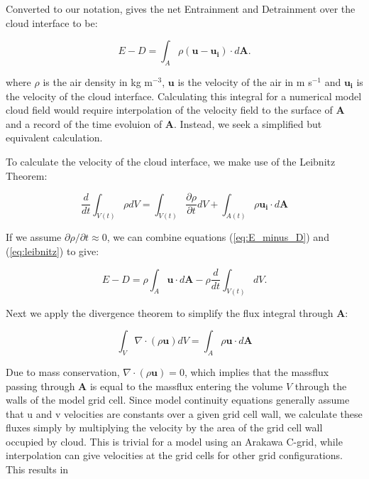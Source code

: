 \documentclass[12pt]{article}
\begin{document}
Converted to our notation, \cite{Siebesma1998} gives the net Entrainment 
and Detrainment over the cloud interface to be:

\begin{equation}
\label{eq:E_minus_D} 
E - D = \int_A \rho ( \mathbf{u} -  \mathbf{u_i}) \cdot d\mathbf{A}.
\end{equation}

where $\rho$ is the air density in kg m$^{-3}$, $\mathbf{u}$ is the velocity
of the air in m s$^{-1}$ and $\mathbf{u_i}$ is the velocity of the cloud 
interface. Calculating this integral for a numerical model cloud field would 
require interpolation of the velocity field to the surface of $\mathbf{A}$ and 
a record of the time evoluion of $\mathbf{A}$.  Instead, we seek a simplified 
but equivalent calculation.

To calculate the velocity of the cloud interface, we make use of the Leibnitz 
Theorem:

\begin{equation}
\label{eq:leibnitz} 
\frac{d}{dt}\int_{V(t)} \rho dV = 
  \int_{V(t)} \frac{\partial \rho}{ \partial t} dV 
  + \int_{A(t)} \rho \mathbf{u_i}\cdot d\mathbf{A}
\end{equation}

If we assume ${\partial \rho}/{ \partial t} \approx 0$, we can combine 
equations (\ref{eq:E_minus_D}) and (\ref{eq:leibnitz}) to give:

\begin{equation}
E - D = \rho \int_A \mathbf{u} \cdot d\mathbf{A} 
      - \rho \frac{d}{dt}\int_{V(t)} dV.
\end{equation}

Next we apply the divergence theorem to simplify the flux integral through 
$\mathbf{A}$:

\begin{equation}
\label{eq:divergence} 
\int_{V} \nabla \cdot (\rho \mathbf{u}) dV = 
  \int_{A} \rho \mathbf{u}\cdot d\mathbf{A}
\end{equation}

Due to mass conservation, $\nabla \cdot (\rho \mathbf{u}) = 0$, which implies 
that the massflux passing through $\mathbf{A}$ is equal to the massflux 
entering the volume $V$ through the walls of the model grid cell.  Since model 
continuity equations generally assume that u and v velocities are constants 
over a given grid cell wall, we calculate these fluxes simply by multiplying 
the velocity by the area of the grid cell wall occupied by cloud.  This is 
trivial for a model using an Arakawa C-grid, while interpolation can give 
velocities at the grid cells for other grid configurations.  This results in
\end{document}

